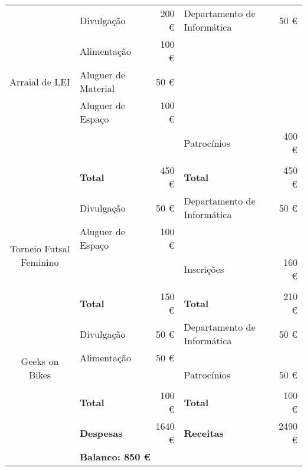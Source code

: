 \begin{center}
{\begin{tabular}{| c | l | r | l | r |}
\multirow{5}{*}{Arraial de LEI}
							& Divulgação		 	& 200 \euro		&  Departamento de Informática 	& 50 \euro			\\ \cline{2-5}
							& Alimentação			& 100 \euro		& 								& 					\\ \cline{2-5}
							& Aluguer de Material	& 50 \euro		& 								& 					\\ \cline{2-5}
							& Aluguer de Espaço		& 100 \euro		& 								& 					\\ \cline{2-5}
							& 						& 				& Patrocínios					& 400 \euro			\\ \cline{2-5}
							&						&				&								&					\\ \cline{2-5}
							& \textbf{Total}		& 450 \euro		& \textbf{Total}				& 450 \euro			\\ \cline{1-5} \hline

\multirow{5}{*}{Torneio Futsal Feminino}
							& Divulgação		 	& 50 \euro		&  Departamento de Informática 	& 50 \euro			\\ \cline{2-5}
							& Aluguer de Espaço		& 100 \euro		& 								& 					\\ \cline{2-5}
							& 						& 				& Inscrições					& 160 \euro			\\ \cline{2-5}
							&						&				&								&					\\ \cline{2-5}
							& \textbf{Total}		& 150 \euro		& \textbf{Total}				& 210 \euro			\\ \cline{1-5} \hline

\multirow{5}{*}{Geeks on Bikes}
							& Divulgação		 	& 50 \euro		&  Departamento de Informática 	& 50 \euro			\\ \cline{2-5}
							& Alimentação			& 50 \euro		& 								& 					\\ \cline{2-5}
							& 						& 				& Patrocínios					& 50 \euro			\\ \cline{2-5}
							&						&				&								&					\\ \cline{2-5}
							& \textbf{Total}		& 100 \euro		& \textbf{Total}				& 100 \euro			\\ \cline{1-5} \hline

\hline
							& \textbf{Despesas}		& 1640 \euro	& \textbf{Receitas}				& 2490 \euro		\\ \hline
							& \multicolumn{4}{|l|}{\textbf{Balanco: 850 \euro}}															\\ \hline
\end{tabular}
}

\end{center}
